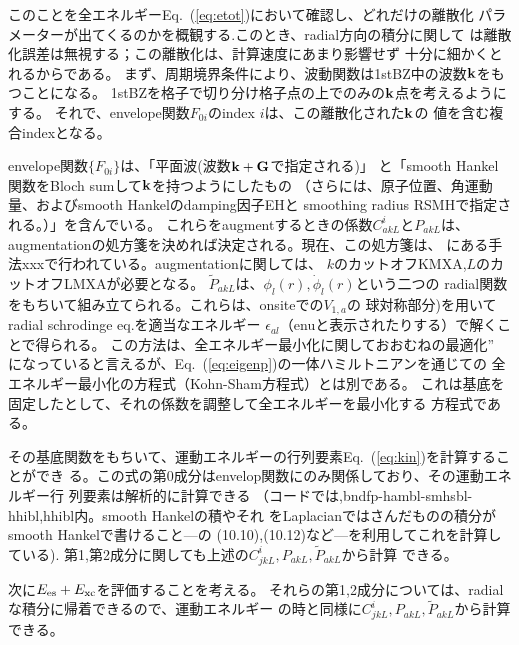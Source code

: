 \documentclass[twocolumn,showpacs,preprintnumbers,amsmath,amssymb,floatfix]{revtex4-1}
\newcommand{\bfk}{{\bf k}}
\newcommand{\bfG}{{\bf G}}
\def\phidot{\dot{\phi}}
\newcommand{\req}[1]{\mbox{Eq.~\!(\ref{#1})}}
\begin{document}
このことを全エネルギー\req{eq:etot}において確認し、どれだけの離散化
パラメーターが出てくるのかを概観する.このとき、radial方向の積分に関して
は離散化誤差は無視する；この離散化は、計算速度にあまり影響せず
十分に細かくとれるからである。
まず、周期境界条件により、波動関数は1stBZ中の波数$\bfk$をもつことになる。
1stBZを格子で切り分け格子点の上でのみの$\bfk$点を考えるようにする。
それで、envelope関数$F_{0i}$のindex $i$は、この離散化された$\bfk$の
値を含む複合indexとなる。

envelope関数$\{F_{0i}\}$は、「平面波(波数$\bfk+\bfG$で指定される)」
と「smooth Hankel関数をBloch sumして$\bfk$を持つようにしたもの
（さらには、原子位置、角運動量、およびsmooth Hankelのdamping因子EHと
smoothing radius RSMHで指定される。）」を含んでいる。
これらをaugmentするときの係数$C^i_{akL}$と$P_{akL}$は、
augmentationの処方箋を決めれば決定される。現在、この処方箋は、
\cite{Bott98}にある手法xxxで行われている。augmentationに関しては、
$k$のカットオフKMXA,$L$のカットオフLMXAが必要となる。
$\tilde{P}_{akL}$は、$\phi_l(r),\phidot_l(r)$という二つの
radial関数をもちいて組み立てられる。これらは、onsiteでの$V_{1,a}$の
球対称部分)を用いてradial schrodinge eq.を適当なエネルギー
$\epsilon_{al}$（enuと表示されたりする）で解くことで得られる。
この方法は、全エネルギー最小化に関しておおむねの最適化''
になっていると言えるが、\req{eq:eigenp}の一体ハミルトニアンを通じての
全エネルギー最小化の方程式（Kohn-Sham方程式）とは別である。
これは基底を固定したとして、それの係数を調整して全エネルギーを最小化する
方程式である。

その基底関数をもちいて、運動エネルギーの行列要素\req{eq:kin}を計算することができ
る。この式の第0成分はenvelop関数にのみ関係しており、その運動エネルギー行
列要素は解析的に計算できる
（コードでは,bndfp-hambl-smhsbl-hhibl,hhibl内。smooth Hankelの積やそれ
をLaplacianではさんだものの積分がsmooth Hankelで書けること---\cite{Bott98}の
(10.10),(10.12)など---を利用してこれを計算している).
第1,第2成分に関しても上述の$C^i_{jkL},{P}_{akL},\tilde{P}_{akL}$から計算
できる。

次に$E_{\rm es}+E_{\rm xc}$を評価することを考える。
それらの第1,2成分については、radialな積分に帰着できるので、運動エネルギー
の時と同様に$C^i_{jkL},{P}_{akL},\tilde{P}_{akL}$から計算できる。
\end{document}
